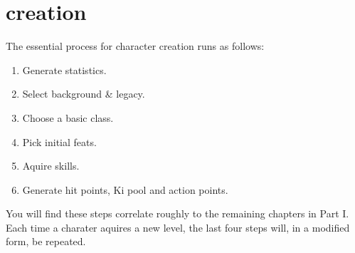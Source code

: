 \chapter{creation}
The essential process for character creation runs as follows:
\begin{enumerate}
\item Generate statistics.
\item Select background \& legacy.
\item Choose a basic class.
\item Pick initial feats.
\item Aquire skills.
\item Generate hit points, Ki pool and action points.
\end{enumerate}
You will find these steps correlate roughly to the remaining
chapters in Part I. Each time a charater aquires a new level, 
the last four steps will, in a modified form, be repeated.
